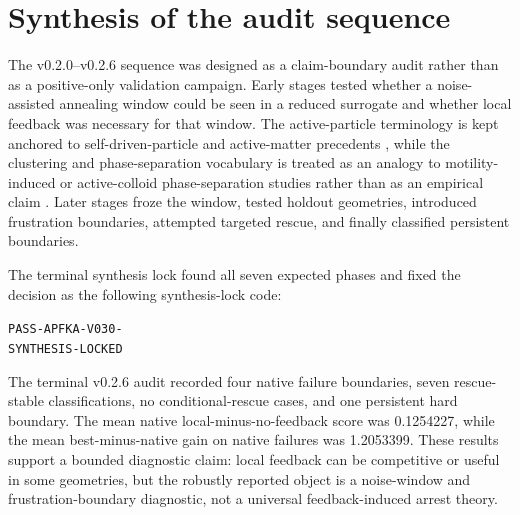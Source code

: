 \documentclass[11pt]{article}
\begin{document}
\section{Synthesis of the audit sequence}
The v0.2.0--v0.2.6 sequence was designed as a claim-boundary audit rather than as a positive-only validation campaign. Early stages tested whether a noise-assisted annealing window could be seen in a reduced surrogate and whether local feedback was necessary for that window. The active-particle terminology is kept anchored to self-driven-particle and active-matter precedents \cite{vicsek1995,marchetti2013,bechinger2016}, while the clustering and phase-separation vocabulary is treated as an analogy to motility-induced or active-colloid phase-separation studies rather than as an empirical claim \cite{cates2015,fily2012,redner2013}. Later stages froze the window, tested holdout geometries, introduced frustration boundaries, attempted targeted rescue, and finally classified persistent boundaries.

The terminal synthesis lock found all seven expected phases and fixed the decision as the following synthesis-lock code:
\begin{center}
\small\texttt{PASS-APFKA-V030-}\\[-1pt]
\small\texttt{SYNTHESIS-LOCKED}
\end{center}
The terminal v0.2.6 audit recorded four native failure boundaries, seven rescue-stable classifications, no conditional-rescue cases, and one persistent hard boundary. The mean native local-minus-no-feedback score was 0.1254227, while the mean best-minus-native gain on native failures was 1.2053399. These results support a bounded diagnostic claim: local feedback can be competitive or useful in some geometries, but the robustly reported object is a noise-window and frustration-boundary diagnostic, not a universal feedback-induced arrest theory.
\end{document}
